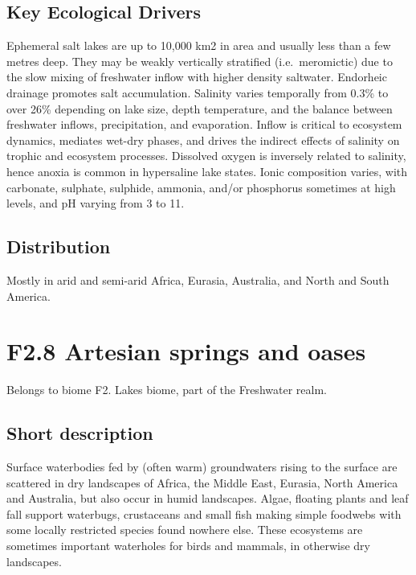 \documentclass[
  letterpaper,
  DIV=11,
  numbers=noendperiod]{scrartcl}
\begin{document}
\subsection{Key Ecological Drivers}\label{key-ecological-drivers-14}

Ephemeral salt lakes are up to 10,000 km2 in area and usually less than
a few metres deep. They may be weakly vertically stratified
(i.e.~meromictic) due to the slow mixing of freshwater inflow with
higher density saltwater. Endorheic drainage promotes salt accumulation.
Salinity varies temporally from 0.3\% to over 26\% depending on lake
size, depth temperature, and the balance between freshwater inflows,
precipitation, and evaporation. Inflow is critical to ecosystem
dynamics, mediates wet-dry phases, and drives the indirect effects of
salinity on trophic and ecosystem processes. Dissolved oxygen is
inversely related to salinity, hence anoxia is common in hypersaline
lake states. Ionic composition varies, with carbonate, sulphate,
sulphide, ammonia, and/or phosphorus sometimes at high levels, and pH
varying from 3 to 11.

\subsection{Distribution}\label{distribution-14}

Mostly in arid and semi-arid Africa, Eurasia, Australia, and North and
South America.

\section{F2.8 Artesian springs and
oases}\label{f2.8-artesian-springs-and-oases}

Belongs to biome F2. Lakes biome, part of the Freshwater realm.

\subsection{Short description}\label{short-description-15}

Surface waterbodies fed by (often warm) groundwaters rising to the
surface are scattered in dry landscapes of Africa, the Middle East,
Eurasia, North America and Australia, but also occur in humid
landscapes. Algae, floating plants and leaf fall support waterbugs,
crustaceans and small fish making simple foodwebs with some locally
restricted species found nowhere else. These ecosystems are sometimes
important waterholes for birds and mammals, in otherwise dry landscapes.
\end{document}
